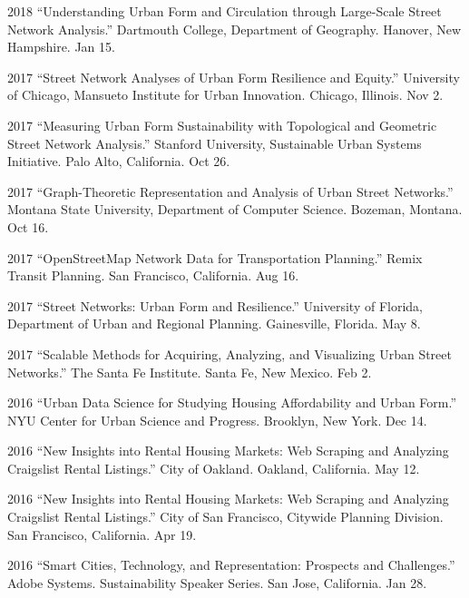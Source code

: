 \documentclass[12pt,letterpaper]{report}
\begin{document}
\begin{tablist}
        \item[2018] \tab{}\enquote{Understanding Urban Form and Circulation through Large-Scale Street Network Analysis.} Dartmouth College, Department of Geography. Hanover, New Hampshire. Jan 15.

        \item[2017] \tab{}\enquote{Street Network Analyses of Urban Form Resilience and Equity.} University of Chicago, Mansueto Institute for Urban Innovation. Chicago, Illinois. Nov 2.

        \item[2017] \tab{}\enquote{Measuring Urban Form Sustainability with Topological and Geometric Street Network Analysis.} Stanford University, Sustainable Urban Systems Initiative. Palo Alto, California. Oct 26.

        \item[2017] \tab{}\enquote{Graph-Theoretic Representation and Analysis of Urban Street Networks.} Montana State University, Department of Computer Science. Bozeman, Montana. Oct 16.

        \item[2017] \tab{}\enquote{OpenStreetMap Network Data for Transportation Planning.} Remix Transit Planning. San Francisco, California. Aug 16.

        \item[2017] \tab{}\enquote{Street Networks: Urban Form and Resilience.} University of Florida, Department of Urban and Regional Planning. Gainesville, Florida. May 8.

        \item[2017] \tab{}\enquote{Scalable Methods for Acquiring, Analyzing, and Visualizing Urban Street Networks.} The Santa Fe Institute. Santa Fe, New Mexico. Feb 2.

        \item[2016] \tab{}\enquote{Urban Data Science for Studying Housing Affordability and Urban Form.} NYU Center for Urban Science and Progress. Brooklyn, New York. Dec 14.

        \item[2016] \tab{}\enquote{New Insights into Rental Housing Markets: Web Scraping and Analyzing Craigslist Rental Listings.} City of Oakland. Oakland, California. May 12.

        \item[2016] \tab{}\enquote{New Insights into Rental Housing Markets: Web Scraping and Analyzing Craigslist Rental Listings.} City of San Francisco, Citywide Planning Division. San Francisco, California. Apr 19.

        \item[2016] \tab{}\enquote{Smart Cities, Technology, and Representation: Prospects and Challenges.} Adobe Systems. Sustainability Speaker Series. San Jose, California. Jan 28.

    \end{tablist}
\end{document}
